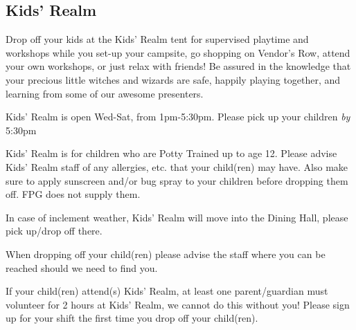 \documentclass[9pt,twoside,openright,final,article,letterpaper]{memoir}
\let\oldsubsection=\subsection
\renewcommand{\subsection}[1]{%
  \vspace{6pt}
  \needspace{1.25in}
  \oldsubsection{#1}
  \nopagebreak}
\begin{document}
\begin{multicols}{2}
  \subsection{Kids' Realm}

  Drop off your kids at the Kids' Realm tent for supervised playtime
  and workshops while you set-up your campsite, go shopping on
  Vendor’s Row, attend your own workshops, or just relax with friends!
  Be assured in the knowledge that your precious little witches and
  wizards are safe, happily playing together, and learning from some
  of our awesome presenters.

  Kids’ Realm is open Wed-Sat, from 1pm-5:30pm. Please pick up your 
  children \emph{by} 5:30pm 

  Kids’ Realm is for children who are Potty Trained up to age 12.
  Please advise Kids’ Realm staff of any allergies, etc. that your
  child(ren) may have. Also make sure to apply sunscreen and/or bug
  spray to your children before dropping them off. FPG does not
  supply them.

  In case of inclement weather, Kids’ Realm will move into the Dining
  Hall, please pick up/drop off there.

  When dropping off your child(ren) please advise the staff where you
  can be reached should we need to find you. 

  If your child(ren) attend(s) Kids’ Realm, at least one
  parent/guardian must volunteer for 2 hours at Kids’ Realm, we cannot
  do this without you! Please sign up for your shift the first time
  you drop off your child(ren).

\end{multicols}


{\hline}
\end{document}
